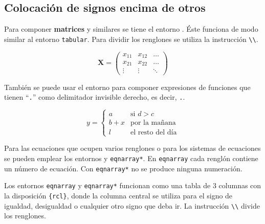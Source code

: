 \subsection{Colocación de signos encima de otros}
\label{sec:vert}

Para  componer  \textbf{matrices}  y  similares se  tiene  el  entorno
. Éste funciona de modo similar al entorno \texttt{tabular}.
Para dividir los renglones se utiliza la instrucción \verb|\\|.

\begin{example}
\begin{displaymath}
\mathbf{X} =
\left( \begin{array}{ccc}
x_{11} & x_{12} & \ldots \\
x_{21} & x_{22} & \ldots \\
\vdots & \vdots & \ddots
\end{array} \right)
\end{displaymath}
\end{example}

También se puede usar el  entorno  para componer expresiones
de  funciones  que  tienen  ``\verb|.|''  como  delimitador  invisible
derecho, es decir, \verb|.|.

\begin{example}
\begin{displaymath}
y = \left\{ \begin{array}{ll}
 a & \textrm{si $d>c$}\\
 b+x & \textrm{por la mañana}\\
 l & \textrm{el resto del día}
  \end{array} \right.
\end{displaymath}
\end{example}

Para las ecuaciones que ocupen varios renglones o para los sistemas de
ecuaciones   se pueden emplear los
entornos   y \verb|eqnarray*|. En  \texttt{eqnarray} cada
renglón contiene  un número  de ecuación.  Con \verb|eqnarray*|  no se
produce ninguna numeración.

Los entornos  \texttt{eqnarray} y \verb|eqnarray*| funcionan  como una
tabla de 3 columnas con  la disposición \verb|{rcl}|, donde la columna
central se utiliza para el  signo de igualdad, desigualdad o cualquier
otro signo que deba ir. La instrucción \verb|\\| divide los renglones.

